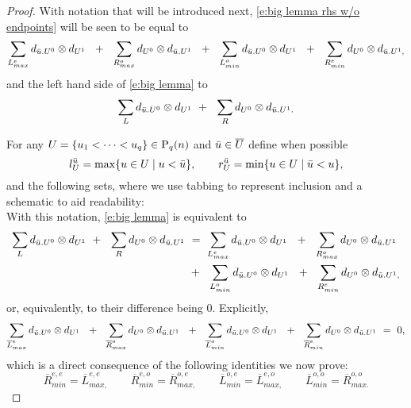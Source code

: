 \begin{proof}
	With notation that will be introduced next, \eqref{e:big lemma rhs w/o endpoints} will be seen to be equal to
	\begin{equation*}
	\sum_{{L}_{max}^{e}} d_{\bu.U^0} \otimes d_{U^1}\ \ +\ \ 
	\sum_{{R}_{max}^{o}} d_{U^0} \otimes d_{\bu.U^1}\ \ +\ \ 
	\sum_{{L}_{min}^{o}} d_{\bu.U^0} \otimes d_{U^1}\ \ +\ \ 
	\sum_{{R}_{min}^{e}} d_{U^0} \otimes d_{\bu.U^1,}
	\end{equation*}
	and the left hand side of \eqref{e:big lemma} to
	\begin{equation*}
	\sum_{L} d_{\bu.U^0} \otimes d_{U^1}\ +\ \ 
	\sum_{R} d_{U^0} \otimes d_{\bu.U^1.}
	\end{equation*}
	
	For any $U = \{u_1 < \cdots < u_q\} \in \P_{q}(n)$ and $\bu \in \overline{U}$ define when possible
	\begin{equation*}
	l_U^\bu = \max \{u \in U \mid u < \bu\}, \qquad
	r_U^\bu = \min\{u \in U \mid \bu < u\},
	\end{equation*}
	and the following sets, where we use tabbing to represent inclusion and a schematic to aid readability:\\
	
	
	
	With this notation, \eqref{e:big lemma} is equivalent to 
	\begin{align*}
	\sum_{L} d_{\bu.U^0} \otimes d_{U^1}\ +\ \ 
	\sum_{R} d_{U^0} \otimes d_{\bu.U^1} \ & = \
	\sum_{{L}_{max}^{e}} d_{\bu.U^0} \otimes d_{U^1}\ \ +\ \ 
	\sum_{{R}_{max}^{o}} d_{U^0} \otimes d_{\bu.U^1}\ \\ \ & +\ \ 
	\sum_{{L}_{min}^{o}} d_{\bu.U^0} \otimes d_{U^1}\ \ +\ \ 
	\sum_{{R}_{min}^{e}} d_{U^0} \otimes d_{\bu.U^1,}
	\end{align*}
	or, equivalently, to their difference being $0$.
	Explicitly,
	\begin{equation*}
	\sum_{\overline{L}_{max}^{e}} d_{\bu.U^0} \otimes d_{U^1}\ \ +\ \ 
	\sum_{\overline{R}_{max}^{o}} d_{U^0} \otimes d_{\bu.U^1}\ \ +\ \ 
	\sum_{\overline{L}_{min}^{o}} d_{\bu.U^0} \otimes d_{U^1}\ \ +\ \ 
	\sum_{\overline{R}_{min}^{e}} d_{U^0} \otimes d_{\bu.U^1} \ = \ 0,
	\end{equation*}
	which is a direct consequence of the following identities we now prove:
	\begin{equation} \label{e:big lemma four identities}
	\overline{R}_{min}^{e,e} = \overline{L}_{max,}^{e,e} \qquad
	\overline{R}_{min}^{e,o} = \overline{R}_{max,}^{o,e} \qquad 
	\overline{L}_{min}^{o,e} = \overline{L}_{max,}^{e,o} \qquad
	\overline{L}_{min}^{o,o} = \overline{R}_{max.}^{o,o}
	\end{equation}
	

\end{proof}
